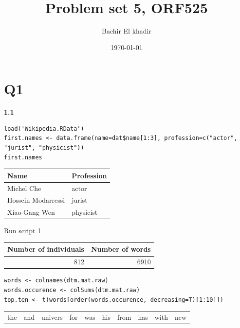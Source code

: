 \documentclass[11pt]{article}
\author{Bachir El khadir}
\date{\today}
\title{Problem set 5, ORF525}
\begin{document}
\maketitle




\section{Q1}
\label{sec:orgheadline1}

\textbf{1.1}

\begin{verbatim}
load('Wikipedia.RData')
first.names <- data.frame(name=dat$name[1:3], profession=c("actor", "jurist", "physicist"))
first.names
\end{verbatim}

\begin{org}
\begin{center}
\begin{tabular}{ll}
Name & Profession\\
\hline
Michel Che & actor\\
Hossein Modarressi & jurist\\
Xiao-Gang Wen & physicist\\
\end{tabular}
\end{center}
\end{org}




Run script 1


\begin{org}
\begin{center}
\begin{tabular}{rr}
Number of individuals & Number of words\\
\hline
812 & 6910\\
\end{tabular}
\end{center}
\end{org}






\begin{verbatim}
words <- colnames(dtm.mat.raw)
words.occurence <- colSums(dtm.mat.raw)
top.ten <- t(words[order(words.occurence, decreasing=T)[1:10]])
\end{verbatim}

\begin{org}
\begin{center}
\begin{tabular}{llllllllll}
the & and & univers & for & was & his & from & has & with & new\\
\end{tabular}
\end{center}
\end{org}
\end{document}
